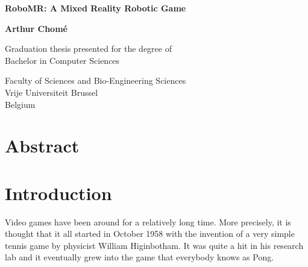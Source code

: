 \documentclass{article}
\begin{document}
\begin{titlepage}
	\begin{center}
		\vspace*{1cm}
		
		\Huge
		\textbf{RoboMR: A Mixed Reality Robotic Game}
		
		\vspace{0.5cm}
		\LARGE
		
		\textbf{Arthur Chomé}
		
		\vfill
		
		Graduation thesis presented for the degree of\\
		Bachelor in Computer Sciences
		
		\vspace{0.8cm}

		\Large
		Faculty of Sciences and Bio-Engineering Sciences\\
		Vrije Universiteit Brussel \\
		Belgium\\
		
	\end{center}
\end{titlepage}
	\tableofcontents	
	\newpage

\section{Abstract}
\section{Introduction}
Video games have been around for a relatively long time. More precisely, it is thought that it all started in October 1958 with the  invention of a very simple tennis game by physicist William Higinbotham. It was quite a hit in his research lab and it eventually grew into the game that everybody knows as Pong.


\end{document}

